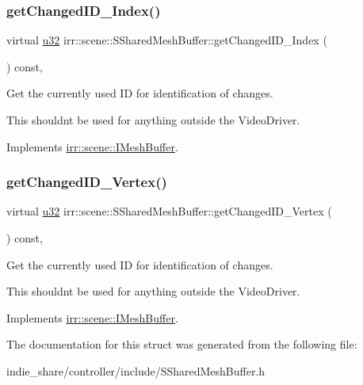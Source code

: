 \subsubsection{\texorpdfstring{get\+Changed\+I\+D\+\_\+\+Index()}{getChangedID\_Index()}}
{\footnotesize\ttfamily virtual \hyperlink{namespaceirr_a0416a53257075833e7002efd0a18e804}{u32} irr\+::scene\+::\+S\+Shared\+Mesh\+Buffer\+::get\+Changed\+I\+D\+\_\+\+Index (\begin{DoxyParamCaption}{ }\end{DoxyParamCaption}) const\hspace{0.3cm}{\ttfamily [inline]}, {\ttfamily [virtual]}}



Get the currently used ID for identification of changes. 

This shouldn\textquotesingle{}t be used for anything outside the Video\+Driver. 

Implements \hyperlink{classirr_1_1scene_1_1IMeshBuffer_acc389d76856dfb06c3ba45a92315e6d8}{irr\+::scene\+::\+I\+Mesh\+Buffer}.

\mbox{\label{structirr_1_1scene_1_1SSharedMeshBuffer_ad9c7307fcad8c9b8db3db98f95863196}} 
\subsubsection{\texorpdfstring{get\+Changed\+I\+D\+\_\+\+Vertex()}{getChangedID\_Vertex()}}
{\footnotesize\ttfamily virtual \hyperlink{namespaceirr_a0416a53257075833e7002efd0a18e804}{u32} irr\+::scene\+::\+S\+Shared\+Mesh\+Buffer\+::get\+Changed\+I\+D\+\_\+\+Vertex (\begin{DoxyParamCaption}{ }\end{DoxyParamCaption}) const\hspace{0.3cm}{\ttfamily [inline]}, {\ttfamily [virtual]}}



Get the currently used ID for identification of changes. 

This shouldn\textquotesingle{}t be used for anything outside the Video\+Driver. 

Implements \hyperlink{classirr_1_1scene_1_1IMeshBuffer_aba48df31edf92a0117692c0be02298db}{irr\+::scene\+::\+I\+Mesh\+Buffer}.



The documentation for this struct was generated from the following file\+:\begin{DoxyCompactItemize}
\item 
indie\+\_\+share/controller/include/S\+Shared\+Mesh\+Buffer.\+h\end{DoxyCompactItemize}
